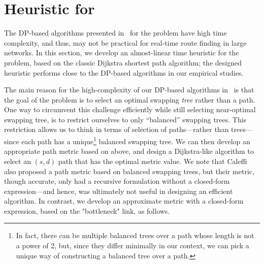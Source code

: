 \section{\dpalt Heuristic for \spp}
\label{sec:swapping_efficient}

The DP-based algorithms presented in~\cite{swapping-tqe-22} for the \spp problem
have high time complexity, and thus, may not be practical for real-time route finding in large networks. In this section, we develop an almost-linear time 
heuristic for the \spp problem, based on the classic Dijkstra shortest
path algorithm; the designed heuristic performs close to the DP-based algorithms
in our empirical studies.

The main reason for the high-complexity of our DP-based algorithms
in~\cite{swapping-tqe-22} is that
the goal of the \spp problem is to select an optimal swapping \textit{tree} 
rather
than a path. One way to circumvent this challenge efficiently while still
selecting near-optimal swapping tree, is to restrict ourselves to only 
``balanced'' swapping trees. This restriction allows us to think in terms
of selection of paths---rather than trees---since each path has a unique\footnote{In fact, there can be multiple balanced trees over a path whose length is not a power of 2, but, since they differ minimally in our context,
we can pick a unique way of constructing a balanced tree over a path.}
balanced swapping tree.
We can then develop an appropriate path metric based on above, and design
a Dijkstra-like algorithm to select an $(s,d)$ path that has the optimal
metric value.
We note that Caleffi~\cite{caleffi} also proposed a path metric based on 
balanced swapping trees, but their metric, though accurate, only had a
recursive formulation without a closed-form
expression---and hence, was ultimately not useful in designing an efficient
algorithm. In contrast, we develop an approximate
metric with a closed-form expression, 
based on the "bottleneck" link, as follows.


